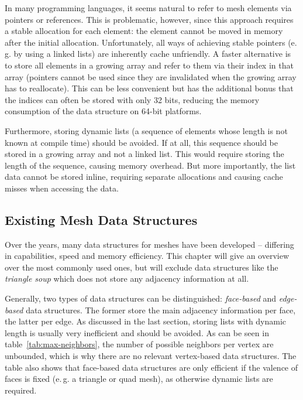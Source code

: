 In many programming languages, it seems natural to refer to mesh elements via pointers or references.
This is problematic, however, since this approach requires a stable allocation for each element: the element cannot be moved in memory after the initial allocation.
Unfortunately, all ways of achieving stable pointers (e.\,g. by using a linked lists) are inherently cache unfriendly.
A faster alternative is to store all elements in a growing array and refer to them via their index in that array (pointers cannot be used since they are invalidated when the growing array has to reallocate).
This can be less convenient but has the additional bonus that the indices can often be stored with only 32 bits, reducing the memory consumption of the data structure on 64-bit platforms.

Furthermore, storing dynamic lists (a sequence of elements whose length is not known at compile time) should be avoided.
If at all, this sequence should be stored in a growing array and not a linked list.
This would require storing the length of the sequence, causing memory overhead.
But more importantly, the list data cannot be stored inline, requiring separate allocations and causing cache misses when accessing the data.

\newpage
\subsection{Existing Mesh Data Structures}

Over the years, many data structures for meshes have been developed -- differing in capabilities, speed and memory efficiency.
This chapter will give an overview over the most commonly used ones, but will exclude data structures like the \emph{triangle soup} which does not store any adjacency information at all.

Generally, two types of data structures can be distinguished: \emph{face-based} and \emph{edge-based} data structures.
The former store the main adjacency information per face, the latter per edge.
As discussed in the last section, storing lists with dynamic length is usually very inefficient and should be avoided.
As can be seen in table~\ref{tab:max-neighbors}, the number of possible neighbors per vertex are unbounded, which is why there are no relevant vertex-based data structures.
The table also shows that face-based data structures are only efficient if the valence of faces is fixed (e.\,g. a triangle or quad mesh), as otherwise dynamic lists are required.

